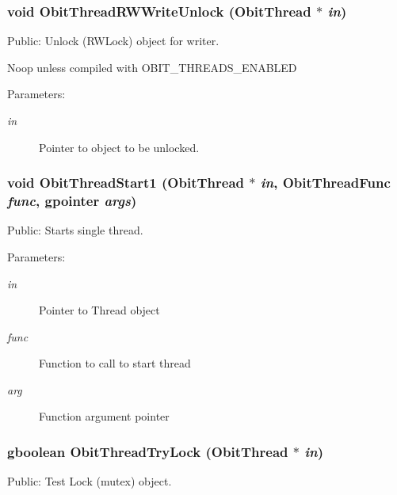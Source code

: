 \subsubsection{\setlength{\rightskip}{0pt plus 5cm}void Obit\-Thread\-RWWrite\-Unlock ({\bf Obit\-Thread} $\ast$ {\em in})}\label{ObitThread_8c_a15}


Public: Unlock (RWLock) object for writer. 

Noop unless compiled with OBIT\_\-THREADS\_\-ENABLED \begin{Desc}
\item[Parameters:]
\begin{description}
\item[{\em in}]Pointer to object to be unlocked. \end{description}
\end{Desc}
\subsubsection{\setlength{\rightskip}{0pt plus 5cm}void Obit\-Thread\-Start1 ({\bf Obit\-Thread} $\ast$ {\em in}, {\bf Obit\-Thread\-Func} {\em func}, gpointer {\em args})}\label{ObitThread_8c_a26}


Public: Starts single thread. 

\begin{Desc}
\item[Parameters:]
\begin{description}
\item[{\em in}]Pointer to Thread object \item[{\em func}]Function to call to start thread \item[{\em arg}]Function argument pointer \end{description}
\end{Desc}
\subsubsection{\setlength{\rightskip}{0pt plus 5cm}gboolean Obit\-Thread\-Try\-Lock ({\bf Obit\-Thread} $\ast$ {\em in})}\label{ObitThread_8c_a8}


Public: Test Lock (mutex) object. 

